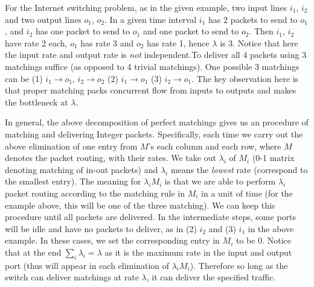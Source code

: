 \documentclass[12pt]{article}
\begin{document}
For the Internet switching problem, as in the given example, two input lines $i_1$, $i_2$ and two output lines $o_1$, $o_2$. In a given time interval $i_1$ has 2 packets to send to $o_1$, and $i_2$ has one packet to send to $o_1$ and one packet to send to $o_2$. Then $i_1$, $i_2$ have rate 2 each, $o_1$ has rate 3 and $o_2$ has rate 1, hence $\lambda$ is 3. Notice that here the input rate and output rate is \emph{not} independent.To deliver all 4 packets using 3 matchings suffice (as opposed to 4 trivial matchings). One possible 3 matchings can be (1) $i_1 \to o_1$, $i_2 \to o_2$ (2) $i_1 \to o_1$ (3) $i_2 \to o_1$. The key observation here is that proper matching packs concurrent flow from inputs to outputs and makes the bottleneck at $\lambda$. 

In general, the above decomposition of perfect matchings gives us an procedure of matching and delivering Integer packets. Specifically, each time we carry out the above elimination of one entry from $M$'s each column and each row, where $M$ denotes the packet routing, with their rates. We take out $\lambda_i$ of $M_i$ (0-1 matrix denoting matching of in-out packets) and $\lambda_i$ means the \emph{lowest} rate (correspond to the smallest entry). The meaning for $\lambda_iM_i$ is that we are able to perform $\lambda_i$ packet routing according to the matching rule in $M_i$ in a unit of time (for the example above, this will be one of the three matching). We can keep this procedure until all packets are delivered. In the intermediate steps, some ports will be idle and have no packets to deliver, as in (2) $i_2$ and (3) $i_1$ in the above example. In these cases, we set the corresponding entry in $M_i$ to be 0. Notice that at the end $\sum_i \lambda_i = \lambda$ as it is the maximum rate in the input and output port (thus will appear in each elimination of $\lambda_iM_i$). Therefore so long as the switch can deliver matchings at rate $\lambda$, it can deliver the specified traffic.
\end{document}

